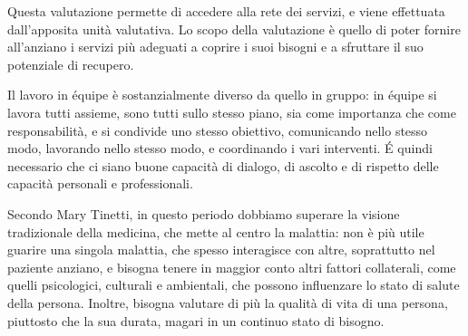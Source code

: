 Questa valutazione permette di accedere alla rete dei servizi, e viene
effettuata dall'apposita unità valutativa. Lo scopo della valutazione è quello
di poter fornire all'anziano i servizi più adeguati a coprire i suoi bisogni e
a sfruttare il suo potenziale di recupero.

Il lavoro in équipe è sostanzialmente diverso da quello in gruppo: in équipe
si lavora tutti assieme, sono tutti sullo stesso piano, sia come importanza che
come responsabilità, e si condivide uno stesso obiettivo, comunicando nello
stesso modo, lavorando nello stesso modo, e coordinando i vari interventi.
\'E quindi necessario che ci siano buone capacità di dialogo, di ascolto e di
rispetto delle capacità personali e professionali.

Secondo Mary Tinetti, in questo periodo dobbiamo superare la visione
tradizionale della medicina, che mette al centro la malattia: non è più utile
guarire una singola malattia, che spesso interagisce con altre, soprattutto nel
paziente anziano, e bisogna tenere in maggior conto altri fattori collaterali,
come quelli psicologici, culturali e ambientali, che possono influenzare lo
stato di salute della persona. Inoltre, bisogna valutare di più la qualità
di vita di una persona, piuttosto che la sua durata, magari in un continuo stato
di bisogno.

